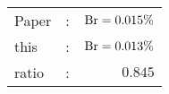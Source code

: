       \begin{tabular}{lcr}
          Paper &:& $\mathrm{Br}  = 0.015\%$ \\
          this      &:& $\mathrm{Br}  = 0.013\%$ \\
		  ratio   &:& $0.845$ \\
      \end{tabular}

